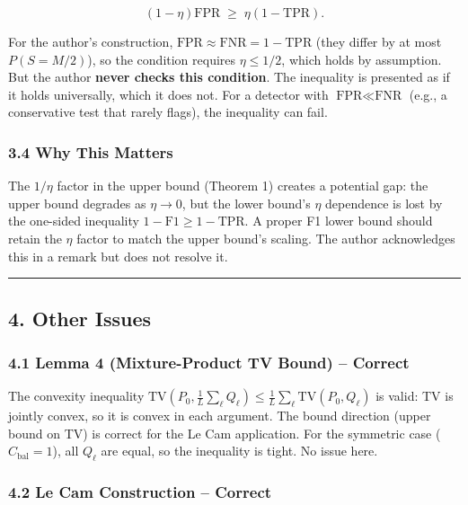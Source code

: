\documentclass[
  12pt,
]{article}
\begin{document}
\[(1-\eta)\text{FPR} \;\geq\; \eta(1-\text{TPR}).\]

For the author's construction,
\(\text{FPR} \approx \text{FNR} = 1-\text{TPR}\) (they differ by at most
\(P(S=M/2)\)), so the condition requires \(\eta \leq 1/2\), which holds
by assumption. But the author \textbf{never checks this condition}. The
inequality is presented as if it holds universally, which it does not.
For a detector with \(\text{FPR} \ll \text{FNR}\) (e.g., a conservative
test that rarely flags), the inequality can fail.

\subsubsection{3.4 Why This Matters}\label{why-this-matters}

The \(1/\eta\) factor in the upper bound (Theorem 1) creates a potential
gap: the upper bound degrades as \(\eta \to 0\), but the lower bound's
\(\eta\) dependence is lost by the one-sided inequality
\(1-\text{F1} \geq 1-\text{TPR}\). A proper F1 lower bound should retain
the \(\eta\) factor to match the upper bound's scaling. The author
acknowledges this in a remark but does not resolve it.

\begin{center}\rule{0.5\linewidth}{0.5pt}\end{center}

\subsection{4. Other Issues}\label{other-issues}

\subsubsection{4.1 Lemma 4 (Mixture-Product TV Bound) --
Correct}\label{lemma-4-mixture-product-tv-bound-correct}

The convexity inequality
\(\text{TV}(P_0, \frac{1}{L}\sum_\ell Q_\ell) \leq \frac{1}{L}\sum_\ell \text{TV}(P_0, Q_\ell)\)
is valid: TV is jointly convex, so it is convex in each argument. The
bound direction (upper bound on TV) is correct for the Le Cam
application. For the symmetric case (\(C_{\text{bal}}=1\)), all
\(Q_\ell\) are equal, so the inequality is tight. No issue here.

\subsubsection{4.2 Le Cam Construction --
Correct}\label{le-cam-construction-correct}
\end{document}

